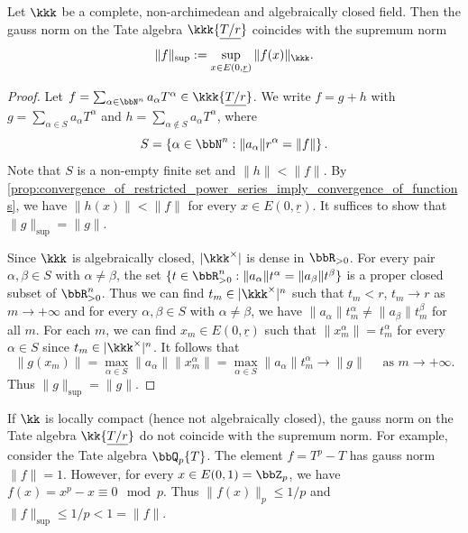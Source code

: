     \begin{proposition}\label{prop:gauss_norm_coincides_with_the_suprum_norm}
        Let \(\kkk\) be a complete, non-archimedean and algebraically closed field.
        Then the gauss norm on the Tate algebra \(\kkk\{ \underline{T/r} \} \) coincides with the supremum norm
        \[
            \|f\|_{\sup} := \sup_{x \in E(0,\underline{r})} \|f(x)\|_{\kkk}.
        \]
    \end{proposition}
    \begin{proof}
        Let \(f = \sum_{\alpha \in \bbN^n} a_\alpha T^\alpha \in \kkk\{ \underline{T/r} \} \).
        We write \(f = g+h\) with \(g = \sum_{\alpha \in S} a_\alpha T^\alpha\) and \(h = \sum_{\alpha \notin S} a_\alpha T^\alpha\), where
        \[ S = \left\{ \alpha \in \bbN^n : \|a_\alpha\| r^\alpha = \|f\| \right\}. \]
        Note that \(S\) is a non-empty finite set and \(\|h\| < \|f\|\).
        By \cref{prop:convergence_of_restricted_power_series_imply_convergence_of_functions}, we have \(\|h(x)\| < \|f\|\) for every \(x \in E(0,\underline{r})\).
        It suffices to show that \(\|g\|_{\sup} = \|g\|\).

        Since \(\kkk\) is algebraically closed, \(|\kkk^\times|\) is dense in \(\bbR_{>0}\).
        For every pair \(\alpha, \beta \in S\) with \(\alpha \neq \beta\), the set \(\{t \in \bbR_{>0}^n : \|a_\alpha\| t^\alpha = \|a_\beta\| t^\beta\}\) is a proper closed subset of \(\bbR_{>0}^n\).
        Thus we can find \(t_m \in |\kkk^\times|^n\) such that \(t_m < r\), \(t_m \to r\) as \(m \to +\infty\) and for every \(\alpha, \beta \in S\) with \(\alpha \neq \beta\), we have \(\|a_\alpha\|t_m^\alpha \neq \|a_\beta\|t_m^\beta\) for all \(m\).
        For each \(m\), we can find \(x_m \in E(0,\underline{r})\) such that \(\|x_m^\alpha\| = t_m^\alpha\) for every \(\alpha \in S\) since \(t_m \in |\kkk^\times|^n\).
        It follows that
        \[ \|g(x_m)\| = \max_{\alpha \in S} \|a_\alpha\| \|x_m^\alpha\| = \max_{\alpha \in S} \|a_\alpha\| t_m^\alpha \to \|g\| \quad \text{ as } m \to +\infty. \]
        Thus \(\|g\|_{\sup} = \|g\|\).
    \end{proof}

    \begin{remark}\label{prop:gauss_norm_does_not_coincides_with_the_suprum_norm_over_non-algebraically_closed_fields}
        If \(\kk\) is locally compact (hence not algebraically closed), the gauss norm on the Tate algebra \(\kk\{ \underline{T/r} \} \) do not coincide with the supremum norm.
        For example, consider the Tate algebra \(\bbQ_p\{T\}\).
        The element \(f = T^p - T\) has gauss norm \(\|f\| = 1\).
        However, for every \(x \in E(0,1) = \bbZ_p\), we have \(f(x) = x^p - x \equiv 0 \mod p\).
        Thus \(\|f(x)\|_p \leq 1/p\) and \(\|f\|_{\sup} \leq 1/p < 1 = \|f\|\).
    \end{remark}

